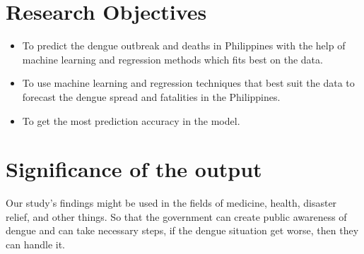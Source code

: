 \documentclass{article}
\begin{document}
\section{Research Objectives}
\begin{itemize}
    \item To predict the dengue outbreak and deaths in Philippines with the help of machine learning and regression methods which fits best on the data.
    \item To use machine learning and regression techniques that best suit the data to forecast the dengue spread and fatalities in the Philippines.
    \item To get the most prediction accuracy in the model.
\end{itemize}

\section{Significance of the output}
Our study's findings might be used in the fields of medicine, health, disaster relief, and other things. So that the government can create public awareness of dengue and
can take necessary steps, if the dengue situation get worse, then they can handle it.


\medskip

\printglossary


\printbibliography
\end{document}
